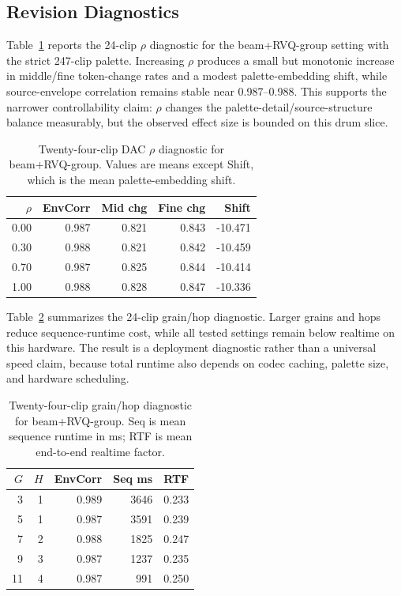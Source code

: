 \documentclass[twoside,a4paper]{article}
\begin{document}
\subsection{Revision Diagnostics}

Table~\ref{tab:rho-diagnostic} reports the 24-clip $\rho$ diagnostic for the beam+RVQ-group setting with the strict 247-clip palette. Increasing $\rho$ produces a small but monotonic increase in middle/fine token-change rates and a modest palette-embedding shift, while source-envelope correlation remains stable near 0.987--0.988. This supports the narrower controllability claim: $\rho$ changes the palette-detail/source-structure balance measurably, but the observed effect size is bounded on this drum slice.

\begin{table}[!t]
    \centering
    \scriptsize
    \setlength{\tabcolsep}{2.8pt}
    \caption{Twenty-four-clip DAC $\rho$ diagnostic for beam+RVQ-group. Values are means except Shift, which is the mean palette-embedding shift.}
    \label{tab:rho-diagnostic}
    \begin{tabular}{rrrrr}
    \toprule
    $\rho$ & EnvCorr & Mid chg & Fine chg & Shift \\
    \midrule
    0.00 & 0.987 & 0.821 & 0.843 & -10.471 \\
    0.30 & 0.988 & 0.821 & 0.842 & -10.459 \\
    0.70 & 0.987 & 0.825 & 0.844 & -10.414 \\
    1.00 & 0.988 & 0.828 & 0.847 & -10.336 \\
    \bottomrule
    \end{tabular}
\end{table}

Table~\ref{tab:grain-hop-diagnostic} summarizes the 24-clip grain/hop diagnostic. Larger grains and hops reduce sequence-runtime cost, while all tested settings remain below realtime on this hardware. The result is a deployment diagnostic rather than a universal speed claim, because total runtime also depends on codec caching, palette size, and hardware scheduling.

\begin{table}[!t]
    \centering
    \scriptsize
    \setlength{\tabcolsep}{2.8pt}
    \caption{Twenty-four-clip grain/hop diagnostic for beam+RVQ-group. Seq is mean sequence runtime in ms; RTF is mean end-to-end realtime factor.}
    \label{tab:grain-hop-diagnostic}
    \begin{tabular}{rrrrr}
    \toprule
    $G$ & $H$ & EnvCorr & Seq ms & RTF \\
    \midrule
    3 & 1 & 0.989 & 3646 & 0.233 \\
    5 & 1 & 0.987 & 3591 & 0.239 \\
    7 & 2 & 0.988 & 1825 & 0.247 \\
    9 & 3 & 0.987 & 1237 & 0.235 \\
    11 & 4 & 0.987 & 991 & 0.250 \\
    \bottomrule
    \end{tabular}
\end{table}
\end{document}
